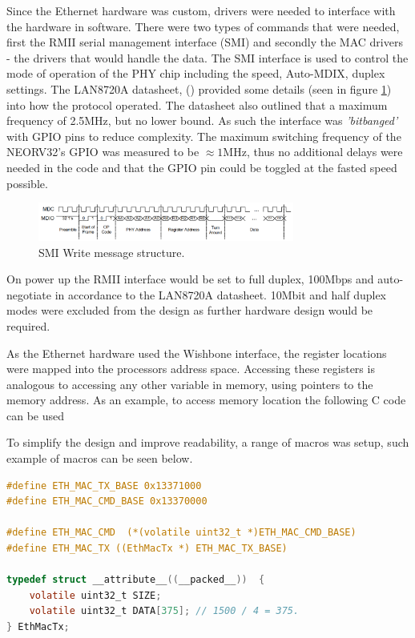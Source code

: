 Since the Ethernet hardware was custom, drivers were needed to interface with the hardware in software. There were two types of commands that were needed, first the RMII serial management interface (SMI) and secondly the MAC drivers - the drivers that would handle the data.  The SMI interface is used to control the mode of operation of the PHY chip including the speed, Auto-MDIX, duplex settings. The LAN8720A datasheet, (\cite{LAN8720ADatasheet}) provided some details (seen in figure \ref{fig:smi_packet_structure}) into how the protocol operated. The datasheet also outlined that a maximum frequency of 2.5MHz, but no lower bound. As such the interface was \textit{'bitbanged'} with GPIO pins to reduce complexity. The maximum switching frequency of the NEORV32's GPIO was measured to be $\approx 1$MHz, thus no additional delays were needed in the code and that the GPIO pin could be toggled at the fasted speed possible. 


\begin{figure}[h!]
    \centering
    \includegraphics[width=0.75\textwidth]{Images/SMIWriteStructure.png}
    \caption[SMI Write message structure]{SMI Write message structure. \cite{LAN8720ADatasheet}}
    \label{fig:smi_packet_structure}
\end{figure}

\noindent On power up the RMII interface would be set to full duplex, 100Mbps and auto-negotiate in accordance to the LAN8720A datasheet. 10Mbit and half duplex modes were excluded from the design as further hardware design would be required.  


As the Ethernet hardware used the Wishbone interface, the register locations were mapped into the processors address space. Accessing these registers is analogous to accessing any other variable in memory, using pointers to the memory address. As an example, to access memory location  the following C code can be used 


To simplify the design and improve readability, a range of macros was setup, such example of macros can be seen below. 

\newpage

\begin{lstlisting}[language=C, caption=Python example]
#define ETH_MAC_TX_BASE 0x13371000
#define ETH_MAC_CMD_BASE 0x13370000

#define ETH_MAC_CMD  (*(volatile uint32_t *)ETH_MAC_CMD_BASE)
#define ETH_MAC_TX ((EthMacTx *) ETH_MAC_TX_BASE)

typedef struct __attribute__((__packed__))  {
    volatile uint32_t SIZE;
    volatile uint32_t DATA[375]; // 1500 / 4 = 375.
} EthMacTx;
\end{lstlisting}

